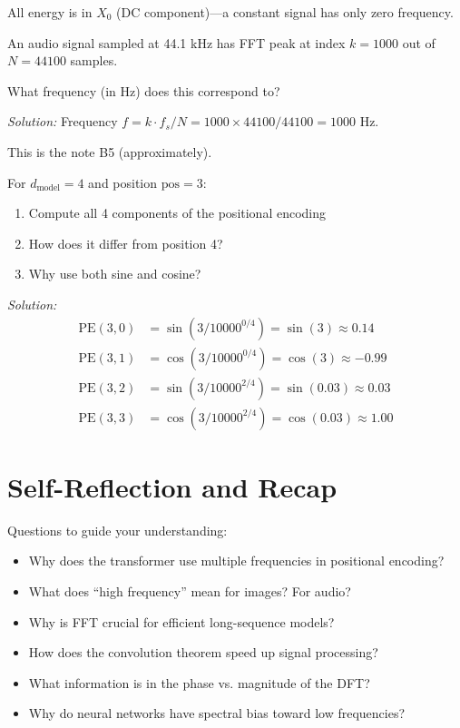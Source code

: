 All energy is in $X_0$ (DC component)---a constant signal has only zero frequency.


\vspace{2em}
 An audio signal sampled at 44.1 kHz has FFT peak at index $k = 1000$ out of $N = 44100$ samples.

What frequency (in Hz) does this correspond to?

\textit{Solution:} Frequency $f = k \cdot f_s / N = 1000 \times 44100 / 44100 = 1000$ Hz.

This is the note B5 (approximately).


\vspace{2em}
 For $d_{\text{model}} = 4$ and position $\text{pos} = 3$:
\begin{enumerate}
    \item Compute all 4 components of the positional encoding
    \item How does it differ from position 4?
    \item Why use both sine and cosine?
\end{enumerate}

\textit{Solution:}
\begin{align*}
    \text{PE}(3, 0) &= \sin(3 / 10000^{0/4}) = \sin(3) \approx 0.14 \\
    \text{PE}(3, 1) &= \cos(3 / 10000^{0/4}) = \cos(3) \approx -0.99 \\
    \text{PE}(3, 2) &= \sin(3 / 10000^{2/4}) = \sin(0.03) \approx 0.03 \\
    \text{PE}(3, 3) &= \cos(3 / 10000^{2/4}) = \cos(0.03) \approx 1.00
\end{align*}




\newpage
\section{Self-Reflection and Recap}

 Questions to guide your understanding:
\begin{itemize}
    \item Why does the transformer use multiple frequencies in positional encoding?
    \item What does ``high frequency'' mean for images? For audio?
    \item Why is FFT crucial for efficient long-sequence models?
    \item How does the convolution theorem speed up signal processing?
    \item What information is in the phase vs. magnitude of the DFT?
    \item Why do neural networks have spectral bias toward low frequencies?
\end{itemize}

